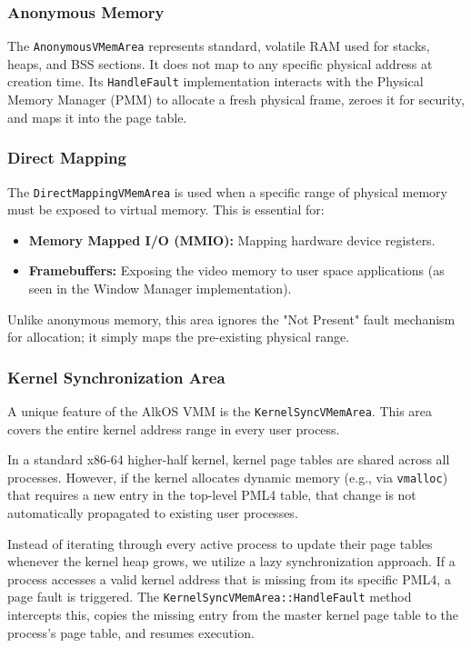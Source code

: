 \documentclass[a4paper,10pt,twoside]{report}
\theoremstyle{definition}
\begin{document}
\subsubsection{Anonymous Memory}

The \texttt{AnonymousVMemArea} represents standard, volatile RAM used for stacks, heaps, and BSS sections. It does not map to any specific physical address at creation time. Its \texttt{HandleFault} implementation interacts with the Physical Memory Manager (PMM) to allocate a fresh physical frame, zeroes it for security, and maps it into the page table.

\subsubsection{Direct Mapping}

The \texttt{DirectMappingVMemArea} is used when a specific range of physical memory must be exposed to virtual memory. This is essential for:
\begin{itemize}
    \item \textbf{Memory Mapped I/O (MMIO):} Mapping hardware device registers.
    \item \textbf{Framebuffers:} Exposing the video memory to user space applications (as seen in the Window Manager implementation).
\end{itemize}

Unlike anonymous memory, this area ignores the "Not Present" fault mechanism for allocation; it simply maps the pre-existing physical range.

\subsubsection{Kernel Synchronization Area}

A unique feature of the AlkOS VMM is the \texttt{KernelSyncVMemArea}. This area covers the entire kernel address range in every user process. 

In a standard x86-64 higher-half kernel, kernel page tables are shared across all processes. However, if the kernel allocates dynamic memory (e.g., via \texttt{vmalloc}) that requires a new entry in the top-level PML4 table, that change is not automatically propagated to existing user processes.

Instead of iterating through every active process to update their page tables whenever the kernel heap grows, we utilize a lazy synchronization approach. If a process accesses a valid kernel address that is missing from its specific PML4, a page fault is triggered. The \texttt{KernelSyncVMemArea::HandleFault} method intercepts this, copies the missing entry from the master kernel page table to the process's page table, and resumes execution.
\end{document}
